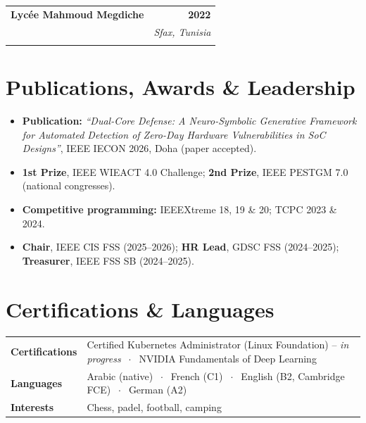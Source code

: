 \documentclass[a4paper,10pt]{article}
\makeatletter
\newcommand{\entry}[4]{%
\vspace{2pt}
\begin{tabular*}{\textwidth}{@{}l@{\extracolsep{\fill}}r@{}}
\textbf{#1} & \textbf{\small #2} \\
\ifstrempty{#3#4}{}{\textit{\small #3} & \textit{\small #4} \\}
\end{tabular*}\par\vspace{-1pt}
}
\makeatother
\begin{document}
\entry
{Lyc\'ee Mahmoud Megdiche}
{2022}
{Baccalaureate in Mathematics, with Honors}
{Sfax, Tunisia}

\section{Publications, Awards \& Leadership}
\small

\begin{itemize}
\item \textbf{Publication:}
\textit{``Dual-Core Defense: A Neuro-Symbolic Generative Framework
for Automated Detection of Zero-Day Hardware Vulnerabilities in
SoC Designs''}, IEEE IECON 2026, Doha (paper accepted).
\item \textbf{1st Prize}, IEEE WIEACT 4.0 Challenge; \textbf{2nd Prize}, IEEE PESTGM 7.0 (national congresses).
\item \textbf{Competitive programming:} IEEEXtreme 18, 19 \& 20; TCPC 2023 \& 2024.
\item \textbf{Chair}, IEEE CIS FSS (2025--2026); \textbf{HR Lead}, GDSC FSS (2024--2025); \textbf{Treasurer}, IEEE FSS SB (2024--2025).
\end{itemize}

\section{Certifications \& Languages}
\small

\begin{tabular}{@{}p{4.1cm}@{}p{\dimexpr\textwidth-4.1cm\relax}@{}}
\textbf{Certifications}
& Certified Kubernetes Administrator (Linux Foundation) -- \textit{in progress}
$\;\cdot\;$ NVIDIA Fundamentals of Deep Learning \\
\textbf{Languages}
& Arabic (native) $\;\cdot\;$ French (C1) $\;\cdot\;$ English (B2, Cambridge FCE) $\;\cdot\;$ German (A2) \\
\textbf{Interests}
& Chess, padel, football, camping \\
\end{tabular}
\end{document}
